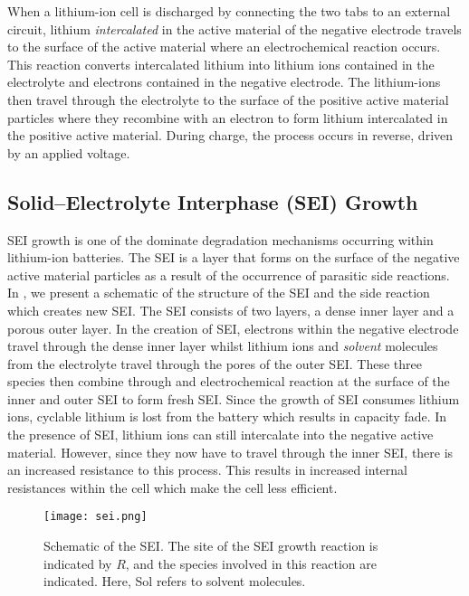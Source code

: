 \documentclass[english,a4paper,oneside,9pt]{extarticle}
\begin{document}
When a lithium-ion cell is discharged by connecting the two tabs to an external circuit, lithium \emph{intercalated} in the active material of the negative electrode travels to the surface of the active material where an electrochemical reaction occurs. This reaction converts intercalated lithium into lithium ions contained in the electrolyte and electrons contained in the negative electrode. The lithium-ions then travel through the electrolyte to the surface of the positive active material particles where they recombine with an electron to form lithium intercalated in the positive active material. During charge, the process occurs in reverse, driven by an applied voltage.

\subsection{Solid--Electrolyte Interphase (SEI) Growth}
SEI growth is one of the dominate degradation mechanisms occurring within lithium-ion batteries. The SEI is a layer that forms on the surface of the negative active material particles as a result of the occurrence of parasitic side reactions. In , we present a schematic of the structure of the SEI and the side reaction which creates new SEI. The SEI consists of two layers, a dense inner layer and a porous outer layer. In the creation of SEI, electrons within the negative electrode travel through the dense inner layer whilst lithium ions and \emph{solvent} molecules from the electrolyte travel through the pores of the outer SEI. These three species then combine through and electrochemical reaction at the surface of the inner and outer SEI to form fresh SEI. Since the growth of SEI consumes lithium ions, cyclable lithium is lost from the battery which results in capacity fade. In the presence of SEI, lithium ions can still intercalate into the negative active material. However, since they now have to travel through the inner SEI, there is an increased resistance to this process. This results in increased internal resistances within the cell which make the cell less efficient.

\begin{figure}[htbp]
	\centering
	\texttt{[image: sei.png]}
	\caption{Schematic of the SEI. The site of the SEI growth reaction is indicated by $R$, and the species involved in this reaction are indicated. Here, Sol refers to solvent molecules.}
	\label{fig:sei}
\end{figure}
\end{document}
